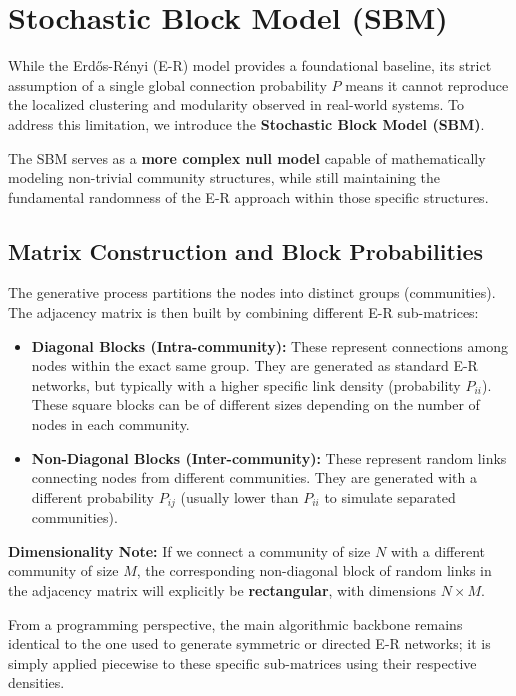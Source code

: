 \section{Stochastic Block Model (SBM)}

While the Erdős-Rényi (E-R) model provides a foundational baseline, its strict assumption of a single global connection probability $P$ means it cannot reproduce the localized clustering and modularity observed in real-world systems. To address this limitation, we introduce the \textbf{Stochastic Block Model (SBM)}.

The SBM serves as a \textbf{more complex null model} capable of mathematically modeling non-trivial community structures, while still maintaining the fundamental randomness of the E-R approach within those specific structures.

\subsection{Matrix Construction and Block Probabilities}
The generative process partitions the nodes into distinct groups (communities). The adjacency matrix is then built by combining different E-R sub-matrices:
\begin{itemize}
    \item \textbf{Diagonal Blocks (Intra-community):} These represent connections among nodes within the exact same group. They are generated as standard E-R networks, but typically with a higher specific link density (probability $P_{ii}$). These square blocks can be of different sizes depending on the number of nodes in each community.
    \item \textbf{Non-Diagonal Blocks (Inter-community):} These represent random links connecting nodes from different communities. They are generated with a different probability $P_{ij}$ (usually lower than $P_{ii}$ to simulate separated communities).
\end{itemize}

\textbf{Dimensionality Note:} If we connect a community of size $N$ with a different community of size $M$, the corresponding non-diagonal block of random links in the adjacency matrix will explicitly be \textbf{rectangular}, with dimensions $N \times M$.

From a programming perspective, the main algorithmic backbone remains identical to the one used to generate symmetric or directed E-R networks; it is simply applied piecewise to these specific sub-matrices using their respective densities.

